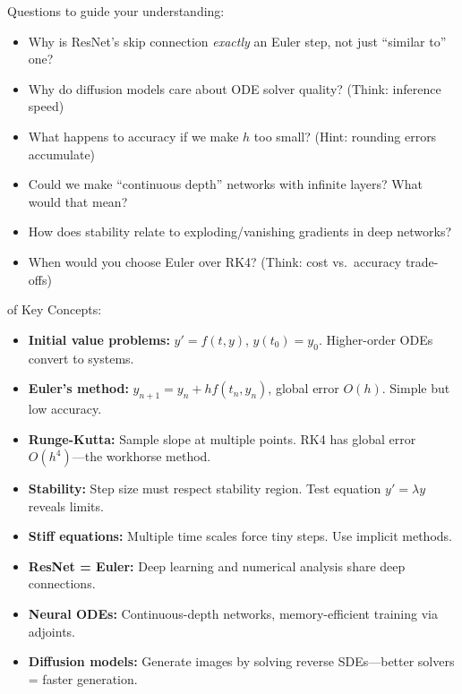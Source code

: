  Questions to guide your understanding:
\begin{itemize}
    \item Why is ResNet's skip connection \emph{exactly} an Euler step, not just ``similar to'' one?
    \item Why do diffusion models care about ODE solver quality? (Think: inference speed)
    \item What happens to accuracy if we make $h$ too small? (Hint: rounding errors accumulate)
    \item Could we make ``continuous depth'' networks with infinite layers? What would that mean?
    \item How does stability relate to exploding/vanishing gradients in deep networks?
    \item When would you choose Euler over RK4? (Think: cost vs.\ accuracy trade-offs)
\end{itemize}


 of Key Concepts:
\begin{itemize}
    \item \textbf{Initial value problems:} $y' = f(t,y)$, $y(t_0) = y_0$. Higher-order ODEs convert to systems.
    \item \textbf{Euler's method:} $y_{n+1} = y_n + hf(t_n, y_n)$, global error $O(h)$. Simple but low accuracy.
    \item \textbf{Runge-Kutta:} Sample slope at multiple points. RK4 has global error $O(h^4)$---the workhorse method.
    \item \textbf{Stability:} Step size must respect stability region. Test equation $y' = \lambda y$ reveals limits.
    \item \textbf{Stiff equations:} Multiple time scales force tiny steps. Use implicit methods.
    \item \textbf{ResNet = Euler:} Deep learning and numerical analysis share deep connections.
    \item \textbf{Neural ODEs:} Continuous-depth networks, memory-efficient training via adjoints.
    \item \textbf{Diffusion models:} Generate images by solving reverse SDEs---better solvers = faster generation.
\end{itemize}




